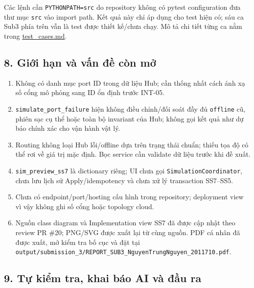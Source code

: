 \documentclass[11pt,a4paper]{article}
\providecommand{\tightlist}{%
  \setlength{\itemsep}{0pt}\setlength{\parskip}{0pt}}
\begin{document}
Các lệnh cần \texttt{PYTHONPATH=src} do repository không có pytest
configuration đưa thư mục \texttt{src} vào import path. Kết quả này chỉ
áp dụng cho test hiện có; sáu ca Sub3 phía trên vẫn là test được thiết
kế/chưa chạy. Mô tả chi tiết từng ca nằm trong \url{test_cases.md}.

\hypertarget{giux1edbi-hux1ea1n-vuxe0-vux1ea5n-ux111ux1ec1-cuxf2n-mux1edf}{%
\subsection{8. Giới hạn và vấn đề còn
mở}\label{giux1edbi-hux1ea1n-vuxe0-vux1ea5n-ux111ux1ec1-cuxf2n-mux1edf}}

\begin{enumerate}
\def\labelenumi{\arabic{enumi}.}
\tightlist
\item
  Không có danh mục port ID trong dữ liệu Hub; cần thống nhất cách ánh
  xạ số cổng mô phỏng sang ID ổn định trước INT-05.
\item
  \texttt{simulate\_port\_failure} hiện không điều chỉnh/đối soát đầy đủ
  \texttt{offline} cũ, phiên sạc cụ thể hoặc toàn bộ invariant của Hub;
  không gọi kết quả như dự báo chính xác cho vận hành vật lý.
\item
  Routing không loại Hub lỗi/offline dựa trên trạng thái chuẩn; thiếu
  tọa độ có thể rơi về giá trị mặc định. Bọc service cần validate dữ
  liệu trước khi đề xuất.
\item
  \texttt{sim\_preview\_ss7} là dictionary riêng; UI chưa gọi
  \texttt{SimulationCoordinator}, chưa lưu lịch sử Apply/idempotency và
  chưa xử lý transaction SS7--SS5.
\item
  Chưa có endpoint/port/hosting cấu hình trong repository; deployment
  view vì vậy không ghi số cổng hoặc topology cloud.
\item
  Nguồn class diagram và Implementation view SS7 đã được cập nhật theo
  review PR \#20; PNG/SVG được xuất lại từ cùng nguồn. PDF cá nhân đã
  được xuất, mở kiểm tra bố cục và đặt tại
  \texttt{output/submission\_3/REPORT\_SUB3\_NguyenTrungNguyen\_2011710.pdf}.
\end{enumerate}

\hypertarget{tux1ef1-kiux1ec3m-tra-khai-buxe1o-ai-vuxe0-ux111ux1ea7u-ra}{%
\subsection{9. Tự kiểm tra, khai báo AI và đầu
ra}\label{tux1ef1-kiux1ec3m-tra-khai-buxe1o-ai-vuxe0-ux111ux1ea7u-ra}}
\end{document}
